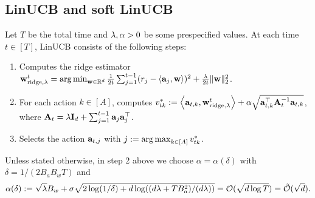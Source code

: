 







\subsection{LinUCB and soft LinUCB}\label{sec:soft-LinUCB}
Let $T$ be the total time and $\lambda,{\alpha}>0$ be some prespecified values. At each time $t\in[T]$, LinUCB consists of the following steps: 
\begin{enumerate}
    \item Computes the ridge estimator ${\mathbf w}^t_{{\rm ridge},\lambda}=\operatorname*{arg\,min}_{{\mathbf w}\in\mathbb{R}^d}\frac{1}{2t}\sum_{j=1}^{t-1}(r_j-\left\langle{\mathbf a}_j,{\mathbf w}\right\rangle)^2+\frac{\lambda}{2t}\|{\mathbf w}\|_2^2$.
    \item For each action $k\in[A]$, computes $v^*_{tk}:=\left\langle{\mathbf a}_{t,k},{\mathbf w}^t_{{\rm ridge},\lambda}\right\rangle+{\alpha}\sqrt{{\mathbf a}_{t,k}^\top {\mathbf A}_{t}^{-1}  {\mathbf a}_{t,k}}$, where ${\mathbf A}_t=\lambda{\mathbf I}_d+\sum_{j=1}^{t-1}{\mathbf a}_j{\mathbf a}_j^\top$.
    \item Selects the action ${\mathbf a}_{t,j}$ with $j:=\operatorname*{arg\,max}_{k\in[A]}v^*_{tk}$.
\end{enumerate}
Unless stated otherwise, in step 2 above we choose $\alpha=\alpha(\delta)$ with $\delta=1/(2B_aB_wT)$ and $${\alpha}(\delta):=\sqrt{\lambda}B_w+\sigma\sqrt{2\log(1/\delta)+d\log((d\lambda+TB_a^2)/(d\lambda))}=\mathcal{O}(\sqrt{d\log {T}})={\tilde{\mathcal O}}(\sqrt{d}).$$


